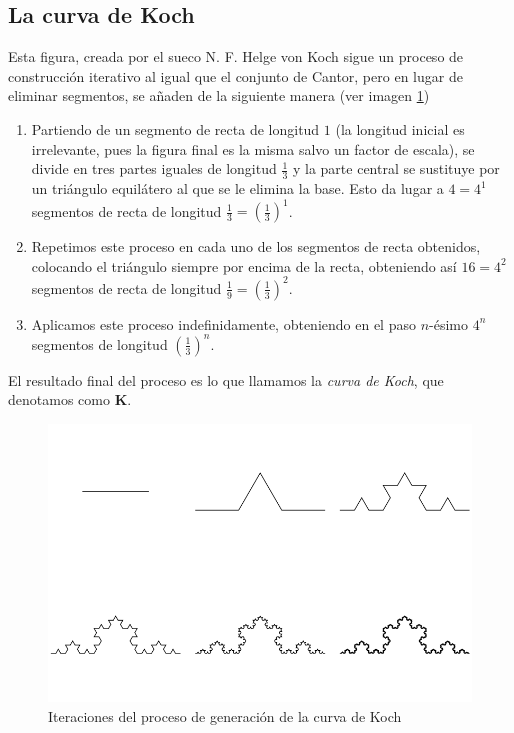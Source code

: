\subsection{La curva de Koch}
\label{subsection:curva-Koch}

Esta figura, creada por el sueco N. F. Helge von Koch sigue un proceso de construcción iterativo al igual que el conjunto de Cantor, pero en lugar de eliminar segmentos, se añaden de la siguiente manera (ver imagen \ref{fig:curva-Koch})

\begin{enumerate}
\item Partiendo de un segmento de recta de longitud $1$ (la longitud inicial es irrelevante, pues la figura final es la misma salvo un factor de escala), se divide en tres partes iguales de longitud $\frac 1 3$ y la parte central se sustituye por un triángulo equilátero al que se le elimina la base. Esto da lugar a $4=4^1$ segmentos de recta de longitud $\frac 1 3=\left(\frac 1 3\right)^1$.

\item Repetimos este proceso en cada uno de los segmentos de recta obtenidos, colocando el triángulo siempre por encima de la recta, obteniendo así $16=4^2$ segmentos de recta de longitud $\frac 1 9=\left(\frac 1 3\right)^2$.

\item Aplicamos este proceso indefinidamente, obteniendo en el paso $n$-ésimo $4^n$ segmentos de longitud $\left(\frac 1 3\right)^n$. 
\end{enumerate}

El resultado final del proceso es lo que llamamos la \textit{curva de Koch}, que denotamos como \textbf{K}.

\begin{figure} [h]
\centering
\includegraphics[scale = 0.6]{img/curva-Koch.png}
\caption{Iteraciones del proceso de generación de la curva de Koch}
 \label{fig:curva-Koch}
\end{figure}

